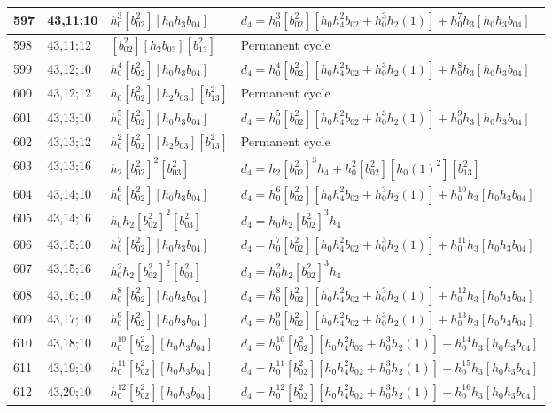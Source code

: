 \documentclass{article}
\begin{document}
\begin{longtable}{|l|l|>{\raggedright\arraybackslash}p{6cm}|>{\raggedright\arraybackslash}p{6cm}|}
\hline
597 & 43,11;10 & $h_0^3[b_{02}^2][h_0h_3b_{04}]$ &$d_{4}=h_0^3[b_{02}^2][h_0h_4^2b_{02} + h_0^3h_2(1)] + h_0^7h_3[h_0h_3b_{04}]$\\
\hline
598 & 43,11;12 & $[b_{02}^2][h_2b_{03}][b_{13}^2]$ & Permanent cycle\\
\hline
599 & 43,12;10 & $h_0^4[b_{02}^2][h_0h_3b_{04}]$ &$d_{4}=h_0^4[b_{02}^2][h_0h_4^2b_{02} + h_0^3h_2(1)] + h_0^8h_3[h_0h_3b_{04}]$\\
\hline
600 & 43,12;12 & $h_0[b_{02}^2][h_2b_{03}][b_{13}^2]$ & Permanent cycle\\
\hline
601 & 43,13;10 & $h_0^5[b_{02}^2][h_0h_3b_{04}]$ &$d_{4}=h_0^5[b_{02}^2][h_0h_4^2b_{02} + h_0^3h_2(1)] + h_0^9h_3[h_0h_3b_{04}]$\\
\hline
602 & 43,13;12 & $h_0^2[b_{02}^2][h_2b_{03}][b_{13}^2]$ & Permanent cycle\\
\hline
603 & 43,13;16 & $h_2[b_{02}^2]^2[b_{03}^2]$ &$d_{4}=h_2[b_{02}^2]^3h_4 + h_0^2[b_{02}^2][h_0(1)^2][b_{13}^2]$\\
\hline
604 & 43,14;10 & $h_0^6[b_{02}^2][h_0h_3b_{04}]$ &$d_{4}=h_0^6[b_{02}^2][h_0h_4^2b_{02} + h_0^3h_2(1)] + h_0^{10}h_3[h_0h_3b_{04}]$\\
\hline
605 & 43,14;16 & $h_0h_2[b_{02}^2]^2[b_{03}^2]$ &$d_{4}=h_0h_2[b_{02}^2]^3h_4$\\
\hline
606 & 43,15;10 & $h_0^7[b_{02}^2][h_0h_3b_{04}]$ &$d_{4}=h_0^7[b_{02}^2][h_0h_4^2b_{02} + h_0^3h_2(1)] + h_0^{11}h_3[h_0h_3b_{04}]$\\
\hline
607 & 43,15;16 & $h_0^2h_2[b_{02}^2]^2[b_{03}^2]$ &$d_{4}=h_0^2h_2[b_{02}^2]^3h_4$\\
\hline
608 & 43,16;10 & $h_0^8[b_{02}^2][h_0h_3b_{04}]$ &$d_{4}=h_0^8[b_{02}^2][h_0h_4^2b_{02} + h_0^3h_2(1)] + h_0^{12}h_3[h_0h_3b_{04}]$\\
\hline
609 & 43,17;10 & $h_0^9[b_{02}^2][h_0h_3b_{04}]$ &$d_{4}=h_0^9[b_{02}^2][h_0h_4^2b_{02} + h_0^3h_2(1)] + h_0^{13}h_3[h_0h_3b_{04}]$\\
\hline
610 & 43,18;10 & $h_0^{10}[b_{02}^2][h_0h_3b_{04}]$ &$d_{4}=h_0^{10}[b_{02}^2][h_0h_4^2b_{02} + h_0^3h_2(1)] + h_0^{14}h_3[h_0h_3b_{04}]$\\
\hline
611 & 43,19;10 & $h_0^{11}[b_{02}^2][h_0h_3b_{04}]$ &$d_{4}=h_0^{11}[b_{02}^2][h_0h_4^2b_{02} + h_0^3h_2(1)] + h_0^{15}h_3[h_0h_3b_{04}]$\\
\hline
612 & 43,20;10 & $h_0^{12}[b_{02}^2][h_0h_3b_{04}]$ &$d_{4}=h_0^{12}[b_{02}^2][h_0h_4^2b_{02} + h_0^3h_2(1)] + h_0^{16}h_3[h_0h_3b_{04}]$\\

\end{longtable}
\end{document}
